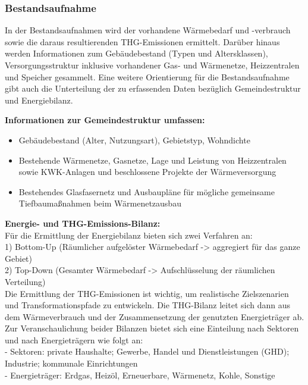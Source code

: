 			\subsubsection{Bestandsaufnahme}
				In der Bestandsaufnahmen wird der vorhandene Wärmebedarf und -verbrauch sowie die daraus resultierenden THG-Emissionen ermittelt. Darüber hinaus werden Informationen zum Gebäudebestand (Typen und Altersklassen), Versorgungsstruktur inklusive vorhandener Gas- und Wärmenetze, Heizzentralen und Speicher gesammelt. 
				Eine weitere Orientierung für die Bestandsaufnahme gibt auch die Unterteilung der zu erfassenden Daten bezüglich Gemeindestruktur und Energiebilanz.
				
				\textbf{Informationen zur Gemeindestruktur umfassen:}
				\begin{itemize}
					\item{Gebäudebestand (Alter, Nutzungsart), Gebietstyp, Wohndichte}
					\item{Bestehende Wärmenetze, Gasnetze, Lage und Leistung von Heizzentralen sowie KWK-Anlagen und beschlossene Projekte der Wärmeversorgung}
					\item{Bestehendes Glasfasernetz und Ausbaupläne für mögliche gemeinsame Tiefbaumaßnahmen beim Wärmenetzausbau}
				\end{itemize}
		
				\textbf{Energie- und THG-Emissions-Bilanz:}\\
				Für die Ermittlung der Energiebilanz bieten sich zwei Verfahren an:\\
				1) Bottom-Up (Räumlicher aufgelöster Wärmebedarf -> aggregiert für das ganze Gebiet)\\
				2) Top-Down (Gesamter Wärmebedarf -> Aufschlüsselung der räumlichen Verteilung)\\
				
				Die Ermittlung der THG-Emissionen ist wichtig, um realistische Zielszenarien und Transformationspfade zu entwickeln. Die THG-Bilanz leitet sich dann aus dem Wärmeverbrauch und der Zusammensetzung der genutzten Energieträger ab. Zur Veranschaulichung beider Bilanzen bietet sich eine Einteilung nach Sektoren und nach Energieträgern wie folgt an:\\
				- Sektoren: private Haushalte; Gewerbe, Handel und Dienstleistungen (GHD); Industrie; kommunale Einrichtungen\\
				- Energieträger: Erdgas, Heizöl, Erneuerbare, Wärmenetz, Kohle, Sonstige\\
				
